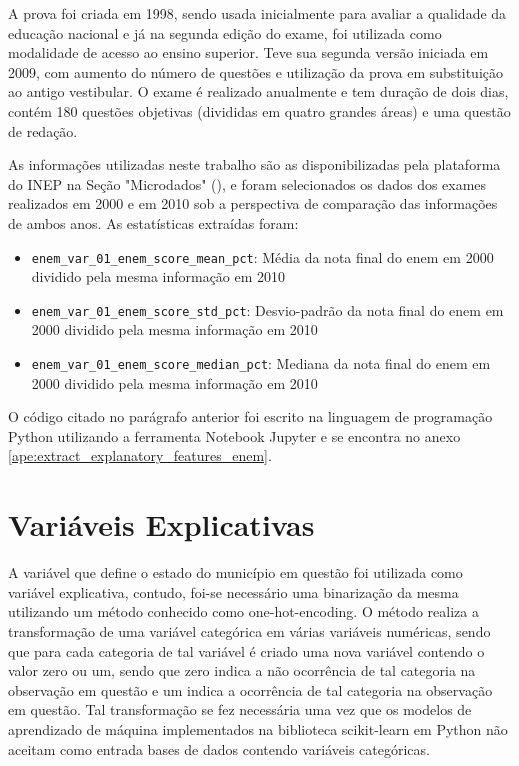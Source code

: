 A prova foi criada em 1998, sendo usada inicialmente para avaliar a qualidade da educação nacional e já na segunda edição do exame, foi utilizada como modalidade de acesso ao ensino superior. Teve sua segunda versão iniciada em 2009, com aumento do número de questões e utilização da prova em substituição ao antigo vestibular. O exame é realizado anualmente e tem duração de dois dias, contém 180 questões objetivas (divididas em quatro grandes áreas) e uma questão de redação.

As informações utilizadas neste trabalho são as disponibilizadas pela plataforma do INEP na Seção "Microdados" (\citet{IBGE}), e foram selecionados os dados dos exames realizados em 2000 e em 2010 sob a perspectiva de comparação das informações de ambos anos. As estatísticas extraídas foram:

\begin{itemize}
	\item \verb|enem_var_01_enem_score_mean_pct|: Média da nota final do enem em 2000 dividido pela mesma informação em 2010
	\item \verb|enem_var_01_enem_score_std_pct|: Desvio-padrão da nota final do enem em 2000 dividido pela mesma informação em 2010
	\item \verb|enem_var_01_enem_score_median_pct|: Mediana da nota final do enem em 2000 dividido pela mesma informação em 2010
\end{itemize}

O código citado no parágrafo anterior foi escrito na linguagem de programação Python utilizando a ferramenta Notebook Jupyter e se encontra no anexo \ref{ape:extract_explanatory_features_enem}.

\section{Variáveis Explicativas}
\label{sec:variaveis_explicativas}

A variável que define o estado do município em questão foi utilizada como variável explicativa, contudo, foi-se necessário uma binarização da mesma utilizando um método conhecido como one-hot-encoding. O método realiza a transformação de uma variável categórica em várias variáveis numéricas, sendo que para cada categoria de tal variável é criado uma nova variável contendo o valor zero ou um, sendo que zero indica a não ocorrência de tal categoria na observação em questão e um indica a ocorrência de tal categoria na observação em questão. Tal transformação se fez necessária uma vez que os modelos de aprendizado de máquina implementados na biblioteca scikit-learn em Python não aceitam como entrada bases de dados contendo variáveis categóricas.

